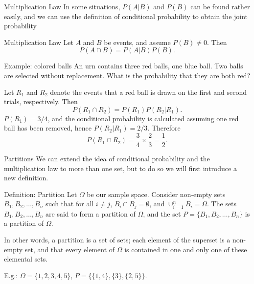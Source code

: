 \begin{frame}[allowframebreaks]{Multiplication Law}
  In some situations, $P(A|B)$ and $P(B)$ can be found rather easily, and we can use the definition of conditional probability to obtain the joint probability
  \begin{block}{Multiplication Law}
    Let $A$ and $B$ be events, and assume $P(B) \neq 0$. Then
    $$
    P(A \cap B) = P(A|B)P(B).
    $$
  \end{block}
  
  \begin{exampleblock}{Example: colored balls}
    An urn contains three red balls, one blue ball. Two balls are selected without replacement. What is the probability that they are both red? 
    
    Let $R_1$ and $R_2$ denote the events that a red ball is drawn on the first and second trials, respectively. Then
    $$
    P(R_1 \cap R_2) = P(R_1)P(R_2 | R_1).
    $$
    $P(R_1) = 3/4$, and the conditional probability is calculated assuming one red ball has been removed, hence $P(R_2 | R_1) = 2/3$. Therefore
    $$
    P(R_1 \cap R_2) = \frac{3}{4}\times\frac{2}{3} = \frac{1}{2}.
    $$
  \end{exampleblock}
\end{frame}

\begin{frame}{Partitions}
  We can extend the idea of conditional probability and the multiplication law to more than one set, but to do so we will first introduce a new definition.
  \begin{block}{Definition: Partition}
    Let $\Omega$ be our sample space. Consider non-empty sets $B_1, B_2, \ldots, B_n$ such that for all $i \neq j$, $B_i \cap B_j = \emptyset$, and $\cup_{i = 1}^n B_i = \Omega$. The sets $B_1, B_2, \ldots, B_n$ are said to form a partition of $\Omega$, and the set $P = \{B_1, B_2, \ldots, B_n\}$ is a partition of $\Omega$.
  \end{block}
  In other words, a partition is a set of sets; each element of the superset is a non-empty set, and that every element of $\Omega$ is contained in one and only one of these elemental sets.
  
  E.g.: $\Omega = \{1, 2, 3, 4, 5\}$, $P = \big\{ \{1, 4\}, \{3\}, \{2, 5\} \big\}.$
\end{frame}

